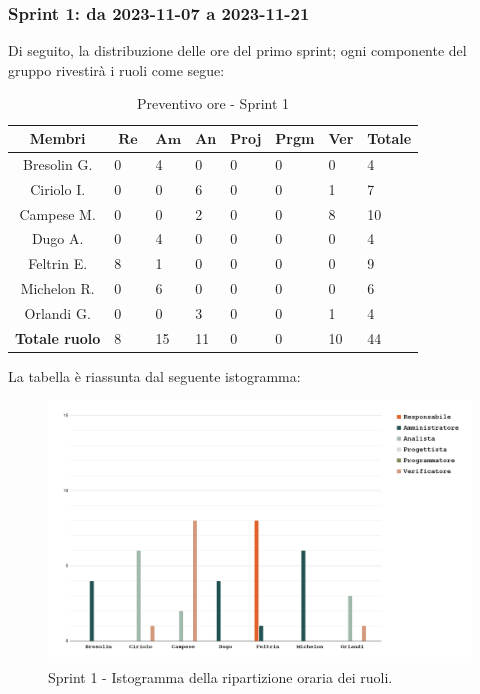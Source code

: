 \documentclass[10pt, a4paper]{article}
\begin{document}
{{{{{{{{\subsubsection{Sprint 1: da 2023-11-07 a 2023-11-21}

Di seguito, la distribuzione delle ore del primo sprint; ogni componente del gruppo rivestirà i ruoli come segue:
\begin{table}[H]
\begin{tabularx}{\textwidth}{c|X|X|X|X|X|X|X}
        \textbf{Membri} & $\operatorname{\textbf{Re}}$ & $\mathrm{\textbf{Am}}$ & \textbf{An} & \textbf{Proj} & \textbf{Prgm} & \textbf{Ver} & \textbf{Totale} \\
        \hline Bresolin G. & 0 & \cellcolor{primarycolor}4 & 0 & 0 & 0 & 0 & 4 \\
        \hline Ciriolo I.  & 0 & 0 & \cellcolor{primarycolor}6 & 0 & 0 & 1 & 7 \\
        \hline Campese M.  & 0 & 0 & 2 & 0 & 0 & \cellcolor{primarycolor}8 & 10 \\
        \hline Dugo A.     & 0 & \cellcolor{primarycolor}4 & 0 & 0 & 0 & 0 & 4 \\
        \hline Feltrin E.  & \cellcolor{primarycolor}8 & 1 & 0 & 0 & 0 & 0 & 9 \\
        \hline Michelon R. & 0 & \cellcolor{primarycolor}6 & 0 & 0 & 0 & 0 & 6 \\
        \hline Orlandi G.  & 0 & 0 & \cellcolor{primarycolor}3 & 0 & 0 & 1 & 4 \\
        \hline
        \textbf{Totale ruolo} & 8 & 15 & 11 & 0 & 0 & 10 & 44 
    \end{tabularx}
    \caption{Preventivo ore - Sprint 1}
    \end{table}

La tabella è riassunta dal seguente istogramma:
 \begin{figure}[H]
        \centering        
        \includegraphics[width=15.5cm]{istogrammi/istogramma_1_periodo.png}
        \caption{Sprint 1 - Istogramma della ripartizione oraria dei ruoli. }
    \end{figure}
 
}}}}}}}}
\end{document}
